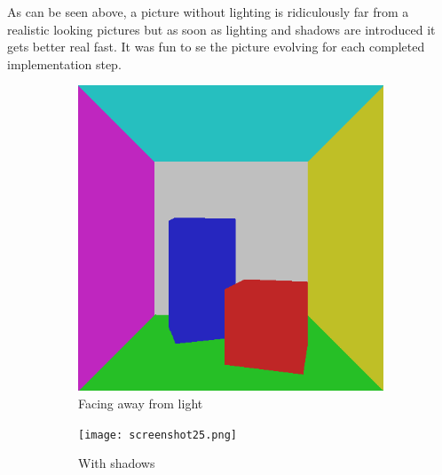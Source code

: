 \documentclass[a4paper,11pt]{article}
\begin{document}
As can be seen above, a picture without lighting is ridiculously far from a realistic looking pictures but as soon as lighting and shadows are introduced it gets better real fast. It was fun to se the picture evolving for each completed implementation step. 

\begin{figure}[h!]
	\centering
	\begin{subfigure}[h]{0.3\linewidth}
		\centering
		\includegraphics[width=\linewidth]{screenshot2.png}
		\caption{Facing away from light}
		\label{fig2}
	\end{subfigure}
	\begin{subfigure}[h!]{0.3\linewidth}
		\centering
		\texttt{[image: screenshot25.png]}
		\caption{With shadows}
		\label{fig3}
	\end{subfigure}
	\begin{subfigure}[h!]{0.3\linewidth}
		\centering

\end{subfigure}
\end{figure}
\end{document}
